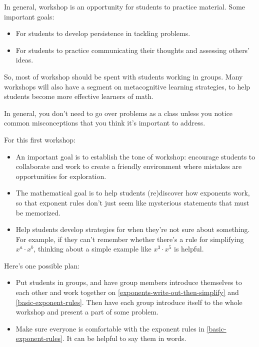 \documentclass{article}
\begin{document}

\begin{workshop}
  In general, workshop is an opportunity for students to practice material. Some important goals:
  \begin{itemize}[nosep]
  \item For students to develop persistence in tackling problems. 
  \item For students to practice communicating their thoughts and assessing others' ideas.
  \end{itemize}
  So, most of workshop should be spent with students working in groups. Many workshops will also have a segment on metacognitive learning strategies, to help students become more effective learners of math. 

  In general, you don't need to go over problems as a class unless you notice common misconceptions that you think it's important to address. 

  For this first workshop:
  \begin{itemize}
  \item An important goal is to establish the tone of workshop: encourage students to collaborate and work to create a friendly environment where mistakes are opportunities for exploration.

  \item The mathematical goal is to help students (re)discover how exponents work, so that exponent rules don't just seem like mysterious statements that must be memorized.

  \item Help students develop strategies for when they're not sure about something. For example, if they can't remember whether there's a rule for simplifying $x^a \cdot x^b$, thinking about a simple example like $x^3 \cdot x^5$ is helpful.
  \end{itemize}

  Here's one possible plan:
  \begin{itemize}
  \item Put students in groups, and have group members introduce themselves to each other and work together on \ref{exponents-write-out-then-simplify} and \ref{basic-exponent-rules}. Then have each group introduce itself to the whole workshop and present a part of some problem.

  \item Make sure everyone is comfortable with the exponent rules in \ref{basic-exponent-rules}. It can be helpful to say them in words.


\end{itemize}
\end{workshop}
\end{document}
